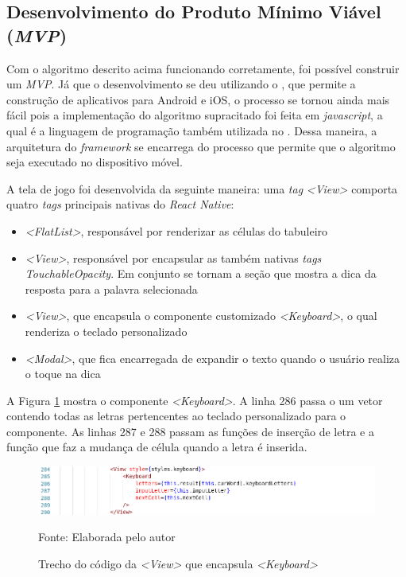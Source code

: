 \subsection{Desenvolvimento do Produto Mínimo Viável (\textit{MVP})}
Com o algoritmo descrito acima funcionando corretamente, foi possível construir um \textit{MVP}. Já que o desenvolvimento se deu utilizando o \cite{RN}, que permite a construção de aplicativos para Android e iOS, o processo se tornou ainda mais fácil pois a implementação do algoritmo supracitado foi feita em \textit{javascript}, a qual é a linguagem de programação também utilizada no \cite{RN}. Dessa maneira, a arquitetura do \textit{framework} se encarrega do processo que permite que o algoritmo seja executado no dispositivo móvel.

A tela de jogo foi desenvolvida da seguinte maneira: uma \textit{tag} \textit{<View>} comporta quatro \textit{tags} principais nativas do \textit{React Native}:

\begin{itemize}
    \item \textit{<FlatList>}, responsável por renderizar as células do tabuleiro
    \item \textit{<View>}, responsável por encapsular as também nativas \textit{tags} \textit{TouchableOpacity}. Em conjunto se tornam a seção que mostra a dica da resposta para a palavra selecionada 
    \item \textit{<View>}, que encapsula o componente customizado \textit{<Keyboard>}, o qual renderiza o teclado personalizado
    \item \textit{<Modal>}, que fica encarregada de expandir o texto quando o usuário realiza o toque na dica
\end{itemize}

A Figura \ref{fig:keyboard} mostra o componente \textit{<Keyboard>}. A linha 286 passa o um vetor contendo todas as letras pertencentes ao teclado personalizado para o componente. As linhas 287 e 288 passam as funções de inserção de letra e a função que faz a mudança de célula quando a letra é inserida. 

\begin{figure}[H]
\centering
    \caption{Trecho do código da \textit{<View>} que encapsula \textit{<Keyboard>}}
    \label{fig:keyboard}
    \includegraphics[width=1.0\textwidth]{Figuras/codeKeyboard.png}
    
    Fonte: Elaborada pelo autor
\end{figure}

